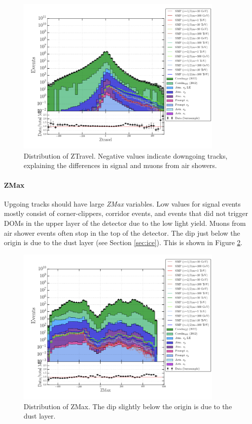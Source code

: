 \begin{figure}
\centering
\includegraphics[width = 0.9\textwidth]{chapter8/img/1D_stack_ztravel.png}
\caption{Distribution of ZTravel. Negative values indicate downgoing tracks, explaining the differences in signal and muons from air showers.}
\label{fig:commonvariablesztravel}
\end{figure}

\paragraph{ZMax}
Upgoing tracks should have large \textit{ZMax} variables. Low values for signal events mostly consist of corner-clippers, corridor events, and events that did not trigger DOMs in the upper layer of the detector due to the low light yield. Muons from air shower events often stop in the top of the detector. The dip just below the origin is due to the dust layer (see Section \ref{sec:ice}). This is shown in Figure \ref{fig:commonvariableszmax}.

\begin{figure}
\centering
\includegraphics[width = 0.9\textwidth]{chapter8/img/1D_stack_zmax.png}
\caption{Distribution of ZMax. The dip slightly below the origin is due to the dust layer.}
\label{fig:commonvariableszmax}
\end{figure}

